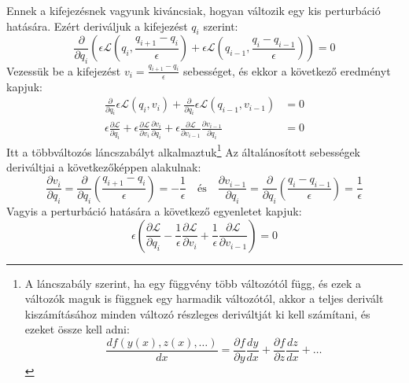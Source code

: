 \documentclass[../main.tex]{subfiles}
\begin{document}
Ennek a kifejezésnek vagyunk kiváncsiak, hogyan változik egy kis perturbáció hatására. Ezért deriváljuk a kifejezést $q_i$ szerint:
\begin{equation}
    \frac{\partial}{\partial q_i} \left( \epsilon\mathcal{L}(q_i, \frac{q_{i+1} - q_i}{\epsilon}) + \epsilon\mathcal{L}(q_{i-1}, \frac{q_{i} - q_{i-1}}{\epsilon}) \right) = 0
\end{equation}
Vezessük be a kifejezést $v_i = \frac{q_{i+1} - q_i}{\epsilon}$ sebességet, és ekkor a következő eredményt kapjuk:
\begin{equation}
    \begin{aligned}
        \frac{\partial}{\partial q_i} \epsilon\mathcal{L}(q_i, v_i) + \frac{\partial}{\partial q_i} \epsilon\mathcal{L}(q_{i-1}, v_{i-1}) &= 0 \\
        \epsilon \frac{\partial \mathcal{L}}{\partial q_i} + \epsilon \frac{\partial \mathcal{L}}{\partial v_i} \frac{\partial v_i}{\partial q_i} + \epsilon \frac{\partial \mathcal{L}}{\partial v_{i-1}} \frac{\partial v_{i-1}}{\partial q_i} &= 0
    \end{aligned}
\end{equation}
Itt a többváltozós láncszabályt alkalmaztuk\footnote{
    A láncszabály szerint, ha egy függvény több változótól függ, és ezek a változók maguk is függnek egy harmadik változótól, akkor a teljes derivált kiszámításához minden változó részleges deriváltját ki kell számítani, és ezeket össze kell adni:
\begin{equation}
    \frac{d f(y(x), z(x), \ldots)}{d x} = \frac{\partial f}{\partial y} \frac{d y}{d x} + \frac{\partial f}{\partial z} \frac{d z}{d x} + \ldots
\end{equation}
}
Az általánosított sebességek deriváltjai a következőképpen alakulnak:
\begin{equation}
    \frac{\partial v_i}{\partial q_i} = \frac{\partial}{\partial q_i} \left( \frac{q_{i+1} - q_i}{\epsilon} \right) =  - \frac{1}{\epsilon} \quad \text{és} \quad \frac{\partial v_{i-1}}{\partial q_i} = \frac{\partial}{\partial q_i} \left( \frac{q_{i} - q_{i-1}}{\epsilon} \right) = \frac{1}{\epsilon}
\end{equation}
Vagyis a perturbáció hatására a következő egyenletet kapjuk:
\begin{equation}
    \epsilon \left( \frac{\partial \mathcal{L}}{\partial q_i} - \frac{1}{\epsilon} \frac{\partial \mathcal{L}}{\partial v_i} + \frac{1}{\epsilon} \frac{\partial \mathcal{L}}{\partial v_{i-1}} \right) = 0
\end{equation}
\end{document}
